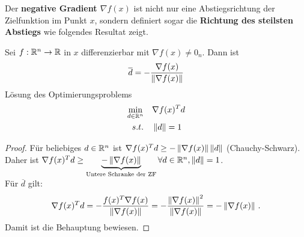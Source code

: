 Der \textbf{negative Gradient $\nabla f(x)$} ist nicht nur eine Abstiegsrichtung der Zielfunktion im Punkt $x$, sondern definiert sogar die \textbf{Richtung des steilsten Abstiegs}
wie folgendes Resultat zeigt.
\begin{Lemma}
Sei $f: \mathbb R^n \rightarrow \mathbb R$ in $x$ differenzierbar mit $\nabla f(x) \neq 0_n$. Dann ist
\begin{align*}
\overline{d}=-\frac{\nabla f(x)}{\left\lVert\nabla f(x)\right\rVert}
\end{align*}
Lösung des Optimierungsproblems
\begin{gather*} 
  			\begin{aligned}
    			\min_{d \in \mathbb R^n}
    			& & & \nabla f(x)^Td \\
    			s.t. 
    			& & & \left\lVert d\right\rVert=1
  			\end{aligned}
	\end{gather*}
\end{Lemma}

\begin{proof}
Für beliebiges $d\in\mathbb R^n$ ist $\nabla f(x)^T d \geq -\left\lVert\nabla f(x)\right\rVert \left\lVert d\right\rVert$ (Chauchy-Schwarz). Daher ist $\nabla f(x)^T d \geq \underbrace{-\left\lVert\nabla f(x)\right\rVert}_{\text{Untere Schranke der ZF}} \forall d\in\mathbb R^n, \left\lVert d\right\rVert=1$.\\
Für $\overline{d}$ gilt:
\begin{align*}
\nabla f(x)^Td=-\frac{f(x)^T \nabla f(x)}{\left\lVert\nabla f(x)\right\rVert}=-\frac{\left\lVert\nabla f(x)\right\rVert^2}{\left\lVert\nabla f(x)\right\rVert}=-\left\lVert\nabla f(x)\right\rVert\,.
\end{align*}
Damit ist die Behauptung bewiesen.
\end{proof}